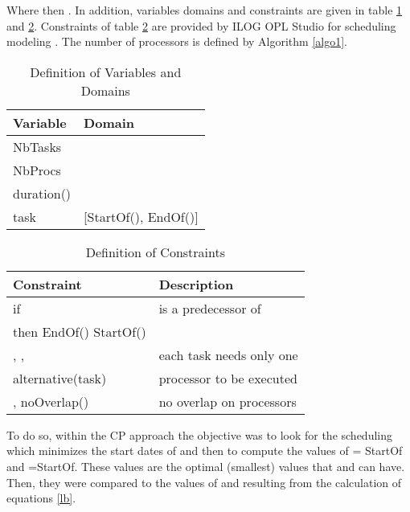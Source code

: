 \documentclass{ijcaArticle}
\begin{document}
Where  then .  In addition, variables domains and constraints are given in table \ref{table1} and \ref{table2}. Constraints of table \ref{table2} are provided by ILOG OPL Studio for scheduling modeling \cite{ilog}.  The number of processors is defined by Algorithm \ref{algo1}. 
  

\begin{table}[tp] \caption{Definition of Variables and Domains}
\label{table1}\centering \begin{tabular}{l|l}
\hline    Variable  & Domain    \\  \hline
NbTasks&        \\ NbProcs  &        \\duration()  &     \\ 
task &  [StartOf(), EndOf()]   \\  \hline
\end{tabular}
\end{table}

\begin{table}[tp] \caption{Definition of Constraints}
\label{table2}\centering \begin{tabular}{l|l}
\hline
Constraint  &  Description \\ \hline
 if  &    is a predecessor of    \\  then EndOf()  StartOf()  & \\
, ,  &  each task needs only one \\ alternative(task) & processor to be executed \\
 ,  noOverlap() &    no overlap on processors \\ \hline \end{tabular}
\end{table}


To do so, within the CP approach the objective was to look for the scheduling which minimizes the start dates of  and  then to
compute the values of  = StartOf and =StartOf. These values are the 
optimal (smallest) values that  and  can have. Then, they were compared to the values of  and  resulting from the calculation of equations \ref{lb}.  
\end{document}
